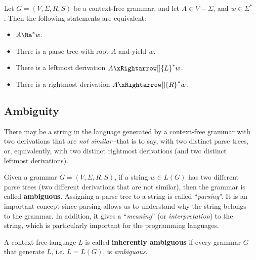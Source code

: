 \begin{multicols}{2}
\begin{theorem}{}
    Let $G = (V, \Sigma, R, S)$ be a context-free grammar, and let $A \in V - \Sigma$, and $w \in \Sigma^*$. Then the following statements are equivalent:
    \begin{itemize}
        \item $A \Ra^* w$.
        \item There is a parse tree with root $A$ and yield $w$.
        \item There is a leftmost derivation $A \xRightarrow[]{L}^* w$.
        \item There is a rightmost derivation $A \xRightarrow[]{R}^* w$. 
    \end{itemize}
\end{theorem}

\subsection{Ambiguity}

There may be a string in the language generated by a context-free grammar with two derivations that are \textit{not similar} -that is to say, with two distinct parse trees, or, equivalently, with two distinct rightmost derivations (and two distinct leftmost derivations).

Given a grammar $G = (V, \Sigma, R, S)$, if a string $w \in L(G)$ has two different parse trees (two different derivations that are not similar), then the grammar is called \textbf{ambiguous}. Assigning a parse tree to a string is called ``\textit{parsing}''. It is an important concept since parsing allows us to understand why the string belongs to the grammar. In addition, it gives a ``\textit{meaning}'' (or \textit{interpretation}) to the string, which is particularly important for the programming languages.

A context-free language $L$ is called \textbf{inherently ambiguous} if every grammar $G$ that generate $L$, i.e. $L = L(G)$, is \textit{ambiguous}.

\end{multicols}
